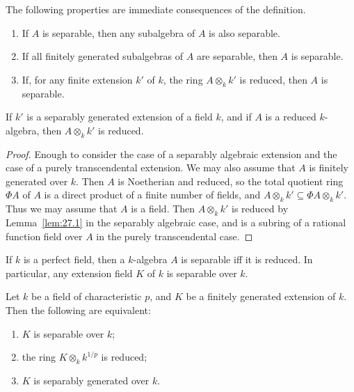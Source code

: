 \documentclass[../main]{subfiles}
\begin{document}
The following properties are immediate consequences of the definition. 

\begin{enumerate}
    \item[1)] If $A$ is separable, then any subalgebra of $A$ is also separable.
    \item[2)] If all finitely generated subalgebras of $A$ are separable, then $A$ is separable.
    \item[3)] If, for any finite extension $k'$ of $k$, the ring $A \otimes_k k'$ is reduced, then $A$ is separable. 
\end{enumerate}

\begin{parlemma}
\label{lem:27.2}
If $k'$ is a separably generated extension of a field $k$, and if $A$ is a reduced $k$-algebra, then $A \otimes_k k'$ is reduced.
\end{parlemma}

\begin{proof}
Enough to consider the case of a separably algebraic extension and the case of a purely transcendental extension. We may also assume that $A$ is finitely generated over $k$. Then $A$ is Noetherian and reduced, so the total quotient ring $\Phi A$ of $A$ is a direct product of a finite number of fields, and $A \otimes_k k' \subseteq \Phi A \otimes_k k'$. Thus we may assume that $A$ is a field. Then $A \otimes_k k'$ is reduced by Lemma~\ref{lem:27.1} in the separably algebraic case, and is a subring of a rational function field over $A$ in the purely transcendental case.
\end{proof}

\begin{corollary}
If $k$ is a perfect field, then a $k$-algebra $A$ is separable iff it is reduced. In particular, any extension field $K$ of $k$ is separable over $k$. 
\end{corollary}

\begin{parlemma}
\label{lem:27.3}
Let $k$ be a field of characteristic $p$, and $K$ be a finitely generated extension of $k$. Then the following are equivalent: 

\begin{enumerate}[label = (\arabic*)]
    \item $K$ is separable over $k$;
    \item the ring $K \otimes_k k^{1/p}$ is reduced;
    \item $K$ is separably generated over $k$. 
\end{enumerate}
\end{parlemma}
\end{document}
